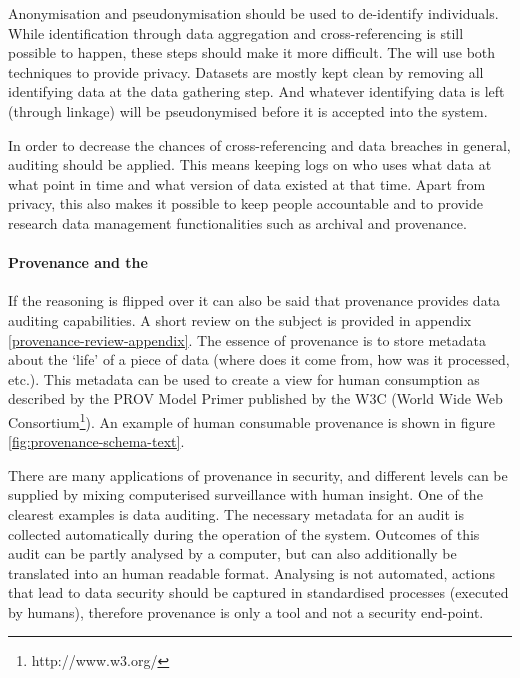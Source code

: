 Anonymisation and pseudonymisation should be used to de-identify individuals.
While identification through data aggregation and cross-referencing is still possible to happen, these steps should make it more difficult.
The \ivfsystem{} will use both techniques to provide privacy. 
Datasets are mostly kept clean by removing all identifying data at the data gathering step.
And whatever identifying data is left (through linkage) will be pseudonymised before it is accepted into the system.

In order to decrease the chances of cross-referencing and data breaches in general, auditing should be applied.
This means keeping logs on who uses what data at what point in time and what version of data existed at that time.
Apart from privacy, this also makes it possible to keep people accountable and to provide research data management functionalities such as archival and provenance.

\paragraph{Provenance and the \ivfsystem{}}
If the reasoning is flipped over it can also be said that provenance provides data auditing capabilities.
A short review on the subject is provided in appendix \ref{provenance-review-appendix}.
The essence of provenance is to store metadata about the `life' of a piece of data (where does it come from, how was it processed, etc.).
This metadata can be used to create a view for human consumption as described by the PROV Model Primer \cite{dsp8gil} published by the W3C (World Wide Web Consortium\footnote{http://www.w3.org/}).
An example of human consumable provenance is shown in figure \ref{fig:provenance-schema-text}.

There are many applications of provenance in security, and  different levels can be supplied by mixing computerised surveillance with human insight.
One of the clearest examples is  data auditing.
The necessary metadata for an audit is collected automatically during the operation of the system.
Outcomes of this audit can be partly analysed by a computer, but can also additionally be translated into an human readable format.
Analysing is not automated, actions that lead to data security should be captured in standardised processes (executed by humans), therefore provenance is only a tool and not a security end-point.

